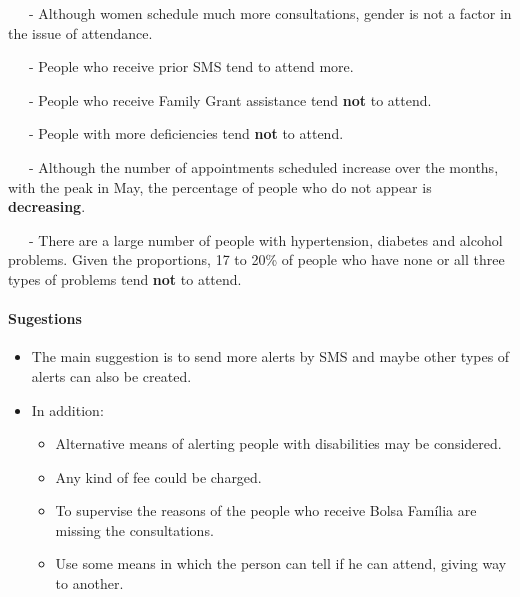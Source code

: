 \documentclass[11pt]{article}
\providecommand{\tightlist}{%
      \setlength{\itemsep}{0pt}\setlength{\parskip}{0pt}}
\begin{document}
~~~- Although women schedule much more consultations, gender is not a
factor in the issue of attendance.

~~~- People who receive prior SMS tend to attend more.

~~~- People who receive Family Grant assistance tend \textbf{not} to
attend.

~~~- People with more deficiencies tend \textbf{not} to attend.

~~~- Although the number of appointments scheduled increase over the
months, with the peak in May, the percentage of people who do not appear
is \textbf{decreasing}.

~~~- There are a large number of people with hypertension, diabetes and
alcohol problems. Given the proportions, 17 to 20\% of people who have
none or all three types of problems tend \textbf{not} to attend.

\paragraph{Sugestions}\label{sugestions}

\begin{itemize}
\tightlist
\item
  The main suggestion is to send more alerts by SMS and maybe other
  types of alerts can also be created.
\item
  In addition:

  \begin{itemize}
  \tightlist
  \item
    Alternative means of alerting people with disabilities may be
    considered.
  \item
    Any kind of fee could be charged.
  \item
    To supervise the reasons of the people who receive Bolsa Família are
    missing the consultations.
  \item
    Use some means in which the person can tell if he can attend, giving
    way to another.
  \end{itemize}
\end{itemize}


    
    
    
    
\end{document}
